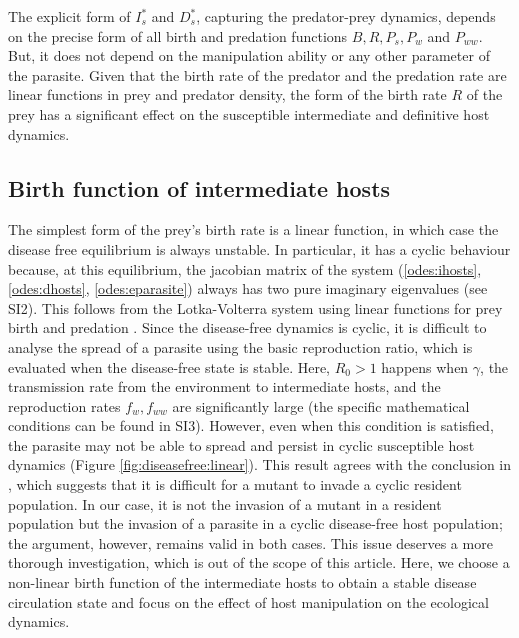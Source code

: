 \documentclass[a4paper]{scrartcl}
\begin{document}
The explicit form of $I_s^*$ and $D_s^*$, capturing the predator-prey dynamics, depends on the precise form of all birth and predation functions $B, R, P_s, P_w$ and $P_{ww}$.
But, it does not depend on the manipulation ability or any other parameter of the parasite. 
Given that the birth rate of the predator and the predation rate are linear functions in prey and predator density, the form of the birth rate $R$ of the prey has a significant effect on the susceptible intermediate and definitive host dynamics.

\subsection*{Birth function of intermediate hosts}

The simplest form of the prey's birth rate is a linear function, in which case the disease free equilibrium is always unstable. In particular, it has a cyclic behaviour because, at this equilibrium, the jacobian matrix of the system (\ref{odes:ihosts}, \ref{odes:dhosts}, \ref{odes:eparasite}) always has two pure imaginary eigenvalues (see SI2). 
This follows from the Lotka-Volterra system using linear functions for prey birth and predation \citep{Lotka1920}.
Since the disease-free dynamics is cyclic, it is difficult to analyse the spread of a parasite using the basic reproduction ratio, which is evaluated when the disease-free state is stable. 
Here,  $R_0 > 1$  happens when $\gamma$, the transmission rate from the environment to intermediate hosts, and the reproduction rates $f_w, f_{ww}$ are significantly large (the specific mathematical conditions can be found in SI3). 
However, even when this condition is satisfied, the parasite may not be able to spread and persist in cyclic susceptible host dynamics (Figure \ref{fig:diseasefree:linear}). 
This result agrees with the conclusion in \citep{Ripa:Evol:2013}, which suggests that it is difficult for a mutant to invade a cyclic resident population. 
In our case, it is not the invasion of a mutant in a resident population but the invasion of a parasite in a cyclic disease-free host population; the argument, however, remains valid in both cases. 
This issue deserves a more thorough investigation, which is out of the scope of this article. 
Here, we choose a non-linear birth function of the intermediate hosts to obtain a stable disease circulation state and focus on the effect of host manipulation on the ecological dynamics. 
\end{document}
